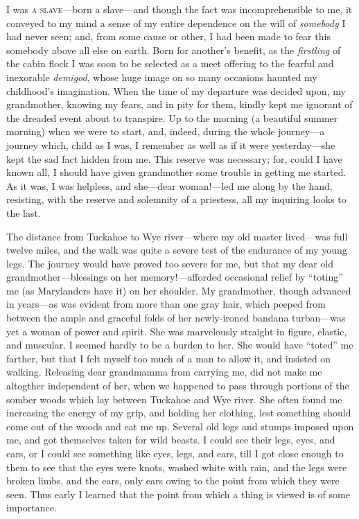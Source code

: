I was \textsc{a slave}---born a slave---and though the fact was
incomprehensible to me, it conveyed to my mind a sense of my entire
dependence on the will of \emph{somebody} I had never seen; and, from
some cause or other, I had been made to fear this somebody above all
else on earth. Born for another's benefit, as the \emph{firstling} of
the cabin flock I was soon to be selected as a meet offering to the
fearful and inexorable \emph{demigod}, whose huge image on so many
occasions haunted my childhood's imagination. When the time of my
departure was decided upon, my grandmother, knowing my fears, and in
pity for them, kindly kept me ignorant of the dreaded event about to
transpire. Up to the morning (a beautiful summer morning) when we were
to start, and, indeed, during the whole journey---a journey which, child
as I was, I remember as well as if it were yesterday---she kept the sad
fact {}hidden from me. This reserve was necessary; for, could I have
known all, I should have given grandmother some trouble in getting me
started. As it was, I was helpless, and she---dear woman!---led me along
by the hand, resisting, with the reserve and solemnity of a priestess,
all my inquiring looks to the last.

The distance from Tuckahoe to Wye river---where my old master
lived---was full twelve miles, and the walk was quite a severe test of
the endurance of my young legs. The journey would have proved too severe
for me, but that my dear old grandmother---blessings on her
memory!---afforded occasional relief by ``toting'' me (as Marylanders
have it) on her shoulder. My grandmother, though advanced in years---as
was evident from more than one gray hair, which peeped from between the
ample and graceful folds of her newly-ironed bandana turban---was yet a
woman of power and spirit. She was marvelously straight in figure,
elastic, and muscular. I seemed hardly to be a burden to her. She would
have ``toted'' me farther, but that I felt myself too much of a man to
allow it, and insisted on walking. Releasing dear grandmamma from
carrying me, did not make me {altogther} independent of her, when we
happened to pass through portions of the somber woods which lay between
Tuckahoe and Wye river. She often found me increasing the energy of my
grip, and holding her clothing, lest something should come out of the
woods and eat me up. Several old logs and stumps imposed upon me, and
got themselves taken for wild beasts. I could see their legs, eyes, and
ears, {}or I could see something like eyes, legs, and ears, till I got
close enough to them to see that the eyes were knots, washed white with
rain, and the legs were broken limbs, and the ears, only ears owing to
the point from which they were seen. Thus early I learned that the point
from which a thing is viewed is of some importance.

